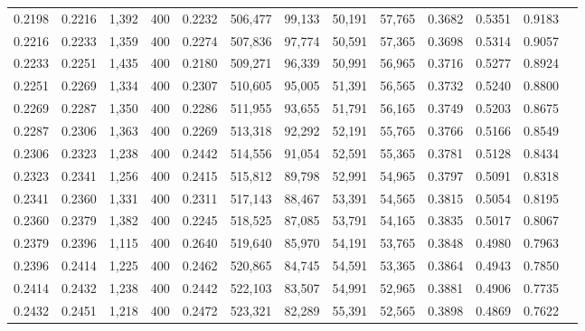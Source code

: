 \begin{tabular}{rrrrrrrrrrrrr}
0.2198 & 0.2216 &  1,392 &   400 &                                     0.2232 & 506,477 &  99,133 &  50,191 &  57,765 & 0.3682 & 0.5351 & 0.9183 \\
0.2216 & 0.2233 &  1,359 &   400 &                                     0.2274 & 507,836 &  97,774 &  50,591 &  57,365 & 0.3698 & 0.5314 & 0.9057 \\
0.2233 & 0.2251 &  1,435 &   400 &                                     0.2180 & 509,271 &  96,339 &  50,991 &  56,965 & 0.3716 & 0.5277 & 0.8924 \\
0.2251 & 0.2269 &  1,334 &   400 &                                     0.2307 & 510,605 &  95,005 &  51,391 &  56,565 & 0.3732 & 0.5240 & 0.8800 \\
0.2269 & 0.2287 &  1,350 &   400 &                                     0.2286 & 511,955 &  93,655 &  51,791 &  56,165 & 0.3749 & 0.5203 & 0.8675 \\
0.2287 & 0.2306 &  1,363 &   400 &                                     0.2269 & 513,318 &  92,292 &  52,191 &  55,765 & 0.3766 & 0.5166 & 0.8549 \\
0.2306 & 0.2323 &  1,238 &   400 &                                     0.2442 & 514,556 &  91,054 &  52,591 &  55,365 & 0.3781 & 0.5128 & 0.8434 \\
0.2323 & 0.2341 &  1,256 &   400 &                                     0.2415 & 515,812 &  89,798 &  52,991 &  54,965 & 0.3797 & 0.5091 & 0.8318 \\
0.2341 & 0.2360 &  1,331 &   400 &                                     0.2311 & 517,143 &  88,467 &  53,391 &  54,565 & 0.3815 & 0.5054 & 0.8195 \\
0.2360 & 0.2379 &  1,382 &   400 &                                     0.2245 & 518,525 &  87,085 &  53,791 &  54,165 & 0.3835 & 0.5017 & 0.8067 \\
0.2379 & 0.2396 &  1,115 &   400 &                                     0.2640 & 519,640 &  85,970 &  54,191 &  53,765 & 0.3848 & 0.4980 & 0.7963 \\
0.2396 & 0.2414 &  1,225 &   400 &                                     0.2462 & 520,865 &  84,745 &  54,591 &  53,365 & 0.3864 & 0.4943 & 0.7850 \\
0.2414 & 0.2432 &  1,238 &   400 &                                     0.2442 & 522,103 &  83,507 &  54,991 &  52,965 & 0.3881 & 0.4906 & 0.7735 \\
0.2432 & 0.2451 &  1,218 &   400 &                                     0.2472 & 523,321 &  82,289 &  55,391 &  52,565 & 0.3898 & 0.4869 & 0.7622 \\

\end{tabular}
